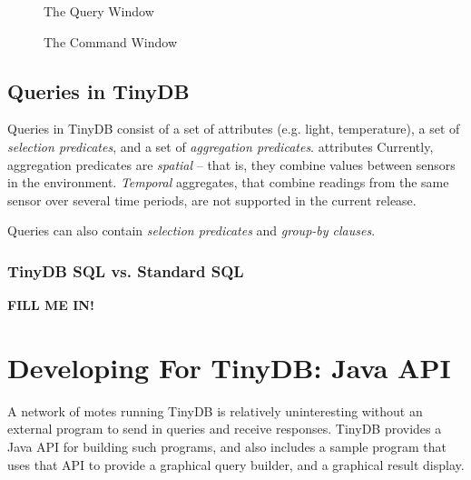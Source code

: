\documentclass[11pt]{article}
\begin{document}
\begin{figure}[ht]
\caption{The Query Window}
\label{fig:query}
\end{figure}
\par

\begin{figure}[ht]
\caption{The Command Window}
\label{fig:command}
\end{figure}
\par


\subsection{Queries in TinyDB}
\label{sec:queries}
Queries in TinyDB consist of a set of attributes (e.g. light, temperature), a set of 
{\it selection predicates}, and a set of {\it aggregation predicates}.  
attributes 
Currently, aggregation predicates are {\it spatial} -- that is,
they combine values between sensors in the environment.  {\it Temporal} aggregates, that combine
readings from the same sensor over several time periods, are not supported in the current
release.

Queries can also contain {\it selection predicates} and {\it group-by clauses}.  

\subsubsection{TinyDB SQL vs. Standard
  SQL}
{\bf FILL ME IN!}

\section{Developing For TinyDB: Java API}
A network of motes running TinyDB is relatively uninteresting without
an external program to send in queries and receive responses.  TinyDB
provides a Java API for building such programs, and also includes a
sample program that uses that API to provide a graphical query
builder, and a graphical result display.
\end{document}
